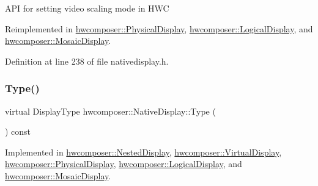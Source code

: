 A\+PI for setting video scaling mode in H\+WC 

Reimplemented in \mbox{\hyperlink{classhwcomposer_1_1PhysicalDisplay_a90bb99a363f4e24b9653f984d52d9ba7}{hwcomposer\+::\+Physical\+Display}}, \mbox{\hyperlink{classhwcomposer_1_1LogicalDisplay_a7f616d7c193e2afbf4b65df4775470c2}{hwcomposer\+::\+Logical\+Display}}, and \mbox{\hyperlink{classhwcomposer_1_1MosaicDisplay_ac634db4100aa1707f28ff2bbb77b8460}{hwcomposer\+::\+Mosaic\+Display}}.



Definition at line 238 of file nativedisplay.\+h.


\begin{DoxyCode}{0}
\end{DoxyCode}
\mbox{\label{classhwcomposer_1_1NativeDisplay_a67018275066174f9e5d4b801cd6fea31}} 
\subsubsection{\texorpdfstring{Type()}{Type()}}
{\footnotesize\ttfamily virtual Display\+Type hwcomposer\+::\+Native\+Display\+::\+Type (\begin{DoxyParamCaption}{ }\end{DoxyParamCaption}) const\hspace{0.3cm}{\ttfamily [pure virtual]}}



Implemented in \mbox{\hyperlink{classhwcomposer_1_1NestedDisplay_a5e0cd87bc15e94b2997fcfbb37060602}{hwcomposer\+::\+Nested\+Display}}, \mbox{\hyperlink{classhwcomposer_1_1VirtualDisplay_a20d0dc4afb2b131ffec31e81e046c52d}{hwcomposer\+::\+Virtual\+Display}}, \mbox{\hyperlink{classhwcomposer_1_1PhysicalDisplay_aa2a50f9dbb2740cf40256bcadad666c4}{hwcomposer\+::\+Physical\+Display}}, \mbox{\hyperlink{classhwcomposer_1_1LogicalDisplay_a012b2a742cfd590405db34ff68f919a9}{hwcomposer\+::\+Logical\+Display}}, and \mbox{\hyperlink{classhwcomposer_1_1MosaicDisplay_a7c5288febea28948c2689d7f6feee183}{hwcomposer\+::\+Mosaic\+Display}}.

\mbox{\label{classhwcomposer_1_1NativeDisplay_abfad592c2a5e956760c194fa7831171c}} 
